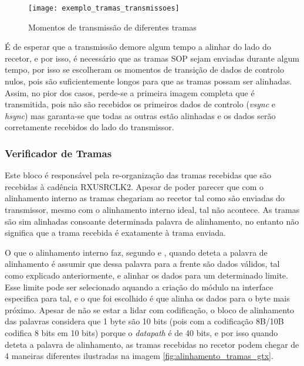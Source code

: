 \begin{figure}[h!]
	\begin{center}
		\leavevmode
		\texttt{[image: exemplo\_tramas\_transmissoes]}
		\captionsetup{width=1.0\linewidth}
		\caption[Momentos de transmissão de diferentes tramas]{Momentos de transmissão de diferentes tramas}
		\label{fig:momentos_tramas}
	\end{center}
\end{figure}

É de esperar que a transmissão demore algum tempo a alinhar do lado do recetor, e por isso, é necessário que as tramas SOP sejam enviadas durante algum tempo, por isso se escolheram os momentos de transição de dados de controlo nulos, pois são suficientemente longos para que as tramas possam ser alinhadas. Assim, no pior dos casos, perde-se a primeira imagem completa que é transmitida, pois não são recebidos os primeiros dados de controlo (\textit{vsync} e \textit{hsync}) mas garanta-se que todas as outras estão alinhadas e os dados serão corretamente recebidos do lado do transmissor.

\subsubsection*{Verificador de Tramas} \label{subsub:serial_frameChecker}
  

Este bloco é responsável pela re-organização das tramas recebidas que são recebidas à cadência RXUSRCLK2. Apesar de poder parecer que com o alinhamento interno as tramas chegariam ao recetor tal como são enviadas do transmissor, mesmo com o alinhamento interno ideal, tal não acontece. As tramas são sim alinhadas consoante determinada palavra de alinhamento, no entanto não significa que a trama recebida é exatamente à trama enviada. 

O que o alinhamento interno faz, segundo \cite{R022} e \cite{R011}, quando deteta a palavra de alinhamento é assumir que dessa palavra para a frente são dados válidos, tal como explicado anteriormente, e alinhar os dados para um determinado limite. Esse limite pode ser selecionado aquando a criação do módulo na interface especifica para tal, e o que foi escolhido é que alinha os dados para o byte mais próximo. Apesar de não se estar a lidar com codificação, o bloco de alinhamento das palavras considera que 1 byte são 10 bits (pois com a codificação 8B/10B codifica 8 bits em 10 bits) porque o \textit{datapath} é de 40 bits, e por isso quando deteta a palavra de alinhamento, as tramas recebidas no recetor podem chegar de 4 maneiras diferentes ilustradas na imagem \ref{fig:alinhamento_tramas_gtx}.


